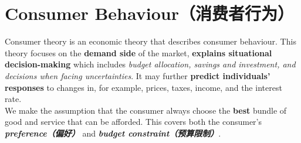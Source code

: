 \section{Consumer Behaviour（消费者行为）}
Consumer theory is an economic theory that describes consumer behaviour. This theory focuses on the \textbf{demand side} of the market, \textbf{explains situational decision-making} which includes \textit{budget allocation, savings and investment, and decisions when facing uncertainties}. It may further \textbf{predict individuals' responses} to changes in, for example, prices, taxes, income, and the interest rate. \\
We make the assumption that the consumer always choose the \textbf{best} bundle of good and service that can be afforded. This covers both the consumer's \textbf{\textit{preference（偏好）}} and \textbf{\textit{budget constraint（预算限制）}}.


